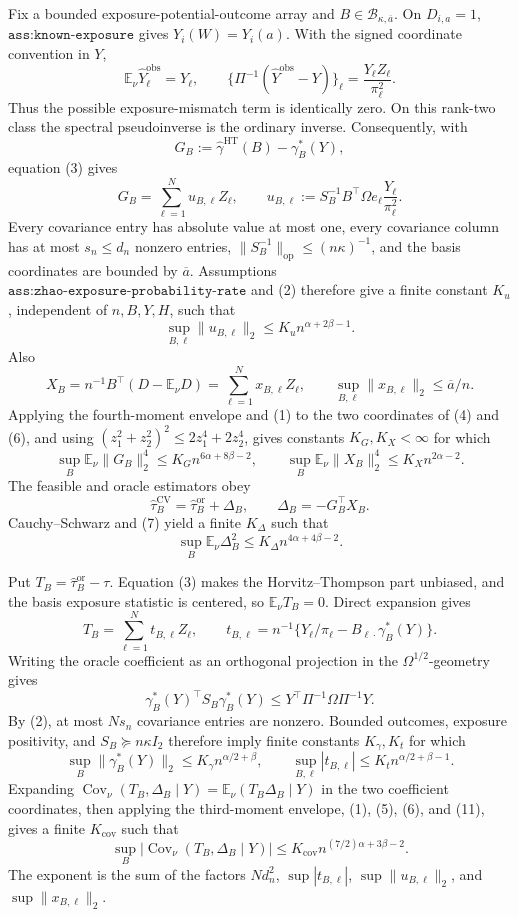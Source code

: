 Fix a bounded exposure-potential-outcome array and \(B\in\mathcal B_{\kappa,\overline a}\).  On \(D_{i,a}=1\), \(\texttt{ass:known-exposure}\) gives \(Y_i(W)=Y_i(a)\).  With the signed coordinate convention in \(Y\),
\[
\mathbb E_\nu\widehat Y_\ell^{\mathrm{obs}}=Y_\ell,
\qquad
\{\Pi^{-1}(\widehat Y^{\mathrm{obs}}-Y)\}_\ell
=\frac{Y_\ell Z_\ell}{\pi_\ell^2}.
\tag{3}
\]
Thus the possible exposure-mismatch term is identically zero.  On this rank-two class the spectral pseudoinverse is the ordinary inverse.  Consequently, with
\[
G_B:=\widehat\gamma^{\mathrm{HT}}(B)-\gamma_B^*(Y),
\]
equation (3) gives
\[
G_B=\sum_{\ell=1}^{N}u_{B,\ell}Z_\ell,
\qquad
u_{B,\ell}:=S_B^{-1}B^\top\Omega e_\ell\frac{Y_\ell}{\pi_\ell^2}.
\tag{4}
\]
Every covariance entry has absolute value at most one, every covariance column has at most \(s_n\le d_n\) nonzero entries, \(\lVert S_B^{-1}\rVert_{\mathrm{op}}\le(n\kappa)^{-1}\), and the basis coordinates are bounded by \(\overline a\).  Assumptions \(\texttt{ass:zhao-exposure-probability-rate}\) and (2) therefore give a finite constant \(K_u\), independent of \(n,B,Y,H\), such that
\[
\sup_{B,\ell}\lVert u_{B,\ell}\rVert_2
\le K_u n^{\alpha+2\beta-1}.
\tag{5}
\]
Also
\[
X_B=n^{-1}B^\top(D-\mathbb E_\nu D)
=\sum_{\ell=1}^{N}x_{B,\ell}Z_\ell,
\qquad
\sup_{B,\ell}\lVert x_{B,\ell}\rVert_2\le\overline a/n.
\tag{6}
\]
Applying the fourth-moment envelope and (1) to the two coordinates of (4) and (6), and using \((z_1^2+z_2^2)^2\le2z_1^4+2z_2^4\), gives constants \(K_G,K_X<\infty\) for which
\[
\sup_B\mathbb E_\nu\lVert G_B\rVert_2^4
\le K_Gn^{6\alpha+8\beta-2},
\qquad
\sup_B\mathbb E_\nu\lVert X_B\rVert_2^4
\le K_Xn^{2\alpha-2}.
\tag{7}
\]
The feasible and oracle estimators obey
\[
\widehat\tau_B^{\mathrm{CV}}
=\widehat\tau_B^{\mathrm{or}}+\Delta_B,
\qquad
\Delta_B=-G_B^\top X_B.
\]
Cauchy--Schwarz and (7) yield a finite \(K_\Delta\) such that
\[
\sup_B\mathbb E_\nu\Delta_B^2
\le K_\Delta n^{4\alpha+4\beta-2}.
\tag{8}
\]

Put \(T_B=\widehat\tau_B^{\mathrm{or}}-\tau\).  Equation (3) makes the Horvitz--Thompson part unbiased, and the basis exposure statistic is centered, so \(\mathbb E_\nu T_B=0\).  Direct expansion gives
\[
T_B=\sum_{\ell=1}^{N}t_{B,\ell}Z_\ell,
\qquad
t_{B,\ell}=n^{-1}\{Y_\ell/\pi_\ell-B_{\ell\cdot}\gamma_B^*(Y)\}.
\tag{9}
\]
Writing the oracle coefficient as an orthogonal projection in the \(\Omega^{1/2}\)-geometry gives
\[
\gamma_B^*(Y)^\top S_B\gamma_B^*(Y)
\le Y^\top\Pi^{-1}\Omega\Pi^{-1}Y.
\tag{10}
\]
By (2), at most \(Ns_n\) covariance entries are nonzero.  Bounded outcomes, exposure positivity, and \(S_B\succeq n\kappa I_2\) therefore imply finite constants \(K_\gamma,K_t\) for which
\[
\sup_B\lVert\gamma_B^*(Y)\rVert_2
\le K_\gamma n^{\alpha/2+\beta},
\qquad
\sup_{B,\ell}|t_{B,\ell}|
\le K_tn^{\alpha/2+\beta-1}.
\tag{11}
\]
Expanding \(\operatorname{Cov}_\nu(T_B,\Delta_B\mid Y)=\mathbb E_\nu(T_B\Delta_B\mid Y)\) in the two coefficient coordinates, then applying the third-moment envelope, (1), (5), (6), and (11), gives a finite \(K_{\mathrm{cov}}\) such that
\[
\sup_B|\operatorname{Cov}_\nu(T_B,\Delta_B\mid Y)|
\le K_{\mathrm{cov}}n^{(7/2)\alpha+3\beta-2}.
\tag{12}
\]
The exponent is the sum of the factors \(Nd_n^2\), \(\sup|t_{B,\ell}|\), \(\sup\lVert u_{B,\ell}\rVert_2\), and \(\sup\lVert x_{B,\ell}\rVert_2\).

